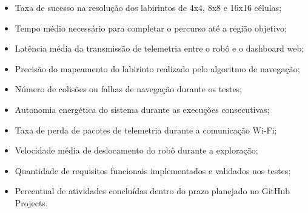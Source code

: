 \begin{itemize}
    \item Taxa de sucesso na resolução dos labirintos de 4x4, 8x8 e 16x16 células;
    
    \item Tempo médio necessário para completar o percurso até a região objetivo;
    
    \item Latência média da transmissão de telemetria entre o robô e o dashboard web;
    
    \item Precisão do mapeamento do labirinto realizado pelo algoritmo de navegação;
    
    \item Número de colisões ou falhas de navegação durante os testes;
    
    \item Autonomia energética do sistema durante as execuções consecutivas;
    
    \item Taxa de perda de pacotes de telemetria durante a comunicação Wi-Fi;
    
    \item Velocidade média de deslocamento do robô durante a exploração;
    
    \item Quantidade de requisitos funcionais implementados e validados nos testes;
    
    \item Percentual de atividades concluídas dentro do prazo planejado no GitHub Projects.
\end{itemize}

